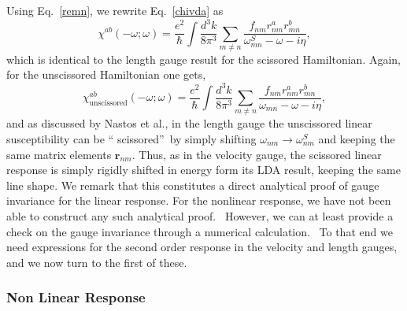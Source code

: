 \documentclass[floatfix,prb,aps,superscriptaddress,11pt]{revtex4}
\begin{document}
Using Eq.~\eqref{remn}, we rewrite Eq.~\eqref{chivda} as 
\begin{equation*}
\chi ^{ab}(-\omega;\omega)=\frac{e^{2}}{\hbar }\int \frac{d^{3}k}{8\pi ^{3}}
\sum_{m\ne n}\frac{f_{nm}r_{nm}^{a}r_{mn}^{b}}{\omega_{mn}^{S}-\omega-i\eta },
\end{equation*}
which is identical to the length gauge result for the scissored 
Hamiltonian.\cite{nastosPRB05} Again, for the unscissored Hamiltonian one 
gets,\cite{sipePRB00} 
\begin{equation*}
\chi _{\mathrm{unscissored}}^{ab}(-\omega;\omega)=\frac{e^{2}}{\hbar }\int \frac{
d^{3}k}{8\pi ^{3}}\sum_{m\ne n}\frac{f_{nm}r_{nm}^{a}r_{mn}^{b}}{\omega_{mn}-\omega
-i\eta },
\end{equation*}
and as discussed by Nastos et al.\cite{nastosPRB05}, in the
length gauge the unscissored linear susceptibility can be \textquotedblleft
scissored\textquotedblright\ by simply shifting $\omega_{nm}\rightarrow \omega
_{nm}^{S}$ and keeping the same matrix elements $\mathbf{r}_{nm}$. Thus, as in the
velocity gauge, the scissored linear response is simply rigidly shifted in
energy form its LDA result, keeping the same line shape. We remark that this
constitutes a direct analytical proof of gauge invariance for the linear
response. For the nonlinear response, we have not been able to construct any
such analytical proof. \ However, we can at least provide a check on the
gauge invariance through a numerical calculation. \ To that end we need
expressions for the second order response in the velocity and length gauges,
and we now turn to the first of these.

\subsubsection{Non Linear Response}
\end{document}
